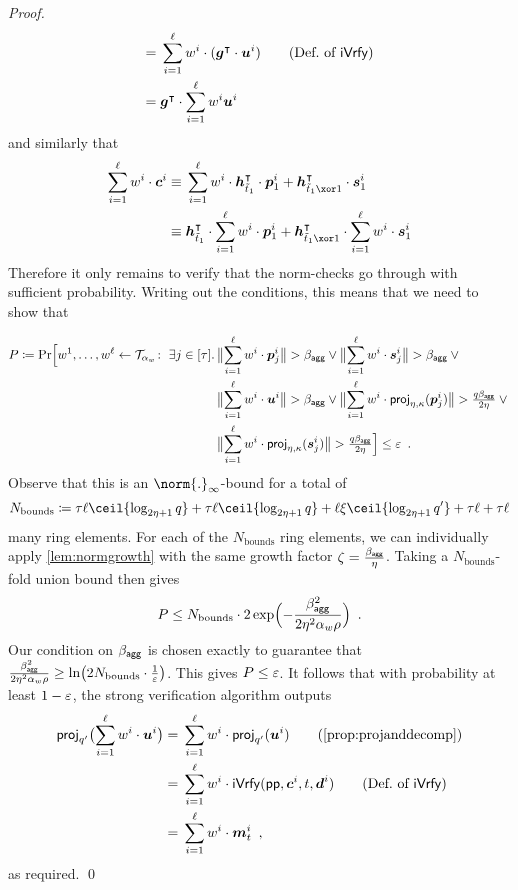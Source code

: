 \begin{proof}
\begin{align*}
  ={}&\sum_{i=1}^{\ell}w^i\cdot(\vec{g}^\transpose\cdot \vec{u}^i)\tag{Def.\ of $\iverify$}\\
  ={}&\vec{g}^\transpose\cdot\sum_{i=1}^{\ell}w^i\vec{u}^i 
\end{align*}
and similarly that 
\begin{align*}
  \sum_{i=1}^{\ell}w^i\cdot \vec{c}^i \equiv{}&\sum_{i=1}^{\ell}w^i\cdot \vec{h}_{\tilde t_1}^\transpose\cdot \vec{p}_{1}^i + \vec{h}_{\tilde t_1 \xor 1}^\transpose \cdot \vec{s}_{1}^i\\
  \equiv{}&\vec{h}_{\tilde t_1}^\transpose\cdot \sum_{i=1}^{\ell}w^i\cdot \vec{p}_{1}^i + \vec{h}_{\tilde t_1 \xor 1}^\transpose \cdot \sum_{i=1}^{\ell}w^i\cdot \vec{s}_{1}^i
\end{align*}
Therefore it only remains to verify that the norm-checks go through with sufficient probability.
Writing out the conditions, this means that we need to show that

\begin{align*}
    P\coloneqq\Pr\Bigl[
      w^1,\dots,w^{\ell} \gets \mathcal{T}_{\alpha_w}\colon\;
      \exists j\in[\tau]\ldotp{}&
      \bigl\Vert\sum_{i=1}^{\ell}w^i\cdot \boldsymbol{p}_j^i\bigr\Vert > \beta_{\mathsf{agg}} 
      \lor 
      \bigl\Vert\sum_{i=1}^{\ell}w^i\cdot \boldsymbol{s}_j^i\bigr\Vert > \beta_{\mathsf{agg}}
      \lor
      {}\\{}&
      \bigl\Vert\sum_{i=1}^{\ell}w^i\cdot\boldsymbol{u}^i\bigr\Vert > \beta_{\mathsf{agg}}
      \lor
      \bigl\Vert\sum_{i=1}^{\ell}w^i\cdot\mathsf{proj}_{\eta,\kappa}(\boldsymbol{p}_j^i)\bigr\Vert > \tfrac{q\beta_{\mathsf{agg}}}{2\eta}
      \lor
      {}\\{}&
      \bigl\Vert\sum_{i=1}^{\ell}w^i\cdot\mathsf{proj}_{\eta,\kappa}(\boldsymbol{s}_j^i)\bigr\Vert > \tfrac{q\beta_{\mathsf{agg}}}{2\eta}
    \Bigr] \leq \varepsilon\enspace.
\end{align*}
Observe that this is an $\norm{.}_\infty$-bound for a total of
\[
  N_\textrm{bounds} \coloneqq \tau\ell \ceil{\log_{2\eta+1}q} + \tau\ell\ceil{\log_{2\eta+1}q} + \ell\xi\ceil{\log_{2\eta+1}q'} + \tau\ell + \tau\ell
\]
many ring elements.
For each of the $N_\textrm{bounds}$ ring elements, we can individually apply \autoref{lem:normgrowth} with the same growth factor $\zeta =\tfrac{\beta_{\mathsf{agg}}}{\eta}$.
Taking a $N_\textrm{bounds}$-fold union bound then gives
\[
 P \leq N_{\textrm{bounds}}\cdot 2\exp\Bigl(-\frac{\beta_{\mathsf{agg}}^2}{2\eta^2\alpha_w\rho}\Bigr)\enspace.
\]
Our condition on $\beta_{\mathsf{agg}}$ is chosen exactly to guarantee that $\tfrac{\beta_{\mathsf{agg}}^2}{2\eta^2\alpha_w\rho} \geq \ln\bigl(2N_{\textrm{bounds}}\cdot \tfrac{1}{\varepsilon} \bigr)$.
This gives $P\leq \varepsilon$.
It follows that with probability at least $1-\varepsilon$, the strong verification algorithm outputs
  \begin{align*}
    \projmod{q'}\bigl(\sum_{i=1}^{\ell}w^i \cdot \vec{u}^i\bigr)
    ={}&\sum_{i=1}^{\ell}w^i \cdot \projmod{q'}(\vec{u}^i) \tag{\autoref{prop:projanddecomp}}\\
    ={}&\sum_{i=1}^{\ell}w^i \cdot \iverify(\params,\vec{c}^i,t,\vec{d}^i)\tag{Def.\ of $\iverify$}\\
    ={}&\sum_{i=1}^{\ell}w^i \cdot \vec{m}_t^i\enspace,
  \end{align*}
  as required.%
  \qed
 

\end{proof}
